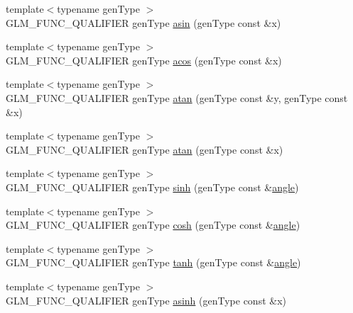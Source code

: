 \begin{DoxyCompactItemize}
\item 
{\footnotesize template$<$typename gen\+Type $>$ }\\G\+L\+M\+\_\+\+F\+U\+N\+C\+\_\+\+Q\+U\+A\+L\+I\+F\+I\+ER gen\+Type \hyperlink{group__core__func__trigonometric_gafca5e8c71ea06be0840227b4aafc5680}{asin} (gen\+Type const \&x)
\item 
{\footnotesize template$<$typename gen\+Type $>$ }\\G\+L\+M\+\_\+\+F\+U\+N\+C\+\_\+\+Q\+U\+A\+L\+I\+F\+I\+ER gen\+Type \hyperlink{group__core__func__trigonometric_gac85497ed2e39d4cac4ac32bed4dfc506}{acos} (gen\+Type const \&x)
\item 
{\footnotesize template$<$typename gen\+Type $>$ }\\G\+L\+M\+\_\+\+F\+U\+N\+C\+\_\+\+Q\+U\+A\+L\+I\+F\+I\+ER gen\+Type \hyperlink{group__core__func__trigonometric_gabf80ac0817d1db032dd6a0969aa2b84a}{atan} (gen\+Type const \&y, gen\+Type const \&x)
\item 
{\footnotesize template$<$typename gen\+Type $>$ }\\G\+L\+M\+\_\+\+F\+U\+N\+C\+\_\+\+Q\+U\+A\+L\+I\+F\+I\+ER gen\+Type \hyperlink{group__core__func__trigonometric_gaa7be96f0c12a40eeac5c7f04a3d465a1}{atan} (gen\+Type const \&x)
\item 
{\footnotesize template$<$typename gen\+Type $>$ }\\G\+L\+M\+\_\+\+F\+U\+N\+C\+\_\+\+Q\+U\+A\+L\+I\+F\+I\+ER gen\+Type \hyperlink{group__core__func__trigonometric_ga2e8c9a896e803661058de83429aa6eda}{sinh} (gen\+Type const \&\hyperlink{group__gtc__quaternion_ga23a3fc7ada5bbb665ff84c92c6e0542c}{angle})
\item 
{\footnotesize template$<$typename gen\+Type $>$ }\\G\+L\+M\+\_\+\+F\+U\+N\+C\+\_\+\+Q\+U\+A\+L\+I\+F\+I\+ER gen\+Type \hyperlink{group__core__func__trigonometric_gaa7685634f6e920ba9a683e5ec7aed976}{cosh} (gen\+Type const \&\hyperlink{group__gtc__quaternion_ga23a3fc7ada5bbb665ff84c92c6e0542c}{angle})
\item 
{\footnotesize template$<$typename gen\+Type $>$ }\\G\+L\+M\+\_\+\+F\+U\+N\+C\+\_\+\+Q\+U\+A\+L\+I\+F\+I\+ER gen\+Type \hyperlink{group__core__func__trigonometric_ga941f20e5315113d1a2e037f073a62f04}{tanh} (gen\+Type const \&\hyperlink{group__gtc__quaternion_ga23a3fc7ada5bbb665ff84c92c6e0542c}{angle})
\item 
{\footnotesize template$<$typename gen\+Type $>$ }\\G\+L\+M\+\_\+\+F\+U\+N\+C\+\_\+\+Q\+U\+A\+L\+I\+F\+I\+ER gen\+Type \hyperlink{group__core__func__trigonometric_gaa52acc1218a5ddd0f8d94fcd098685b1}{asinh} (gen\+Type const \&x)

\end{DoxyCompactItemize}
